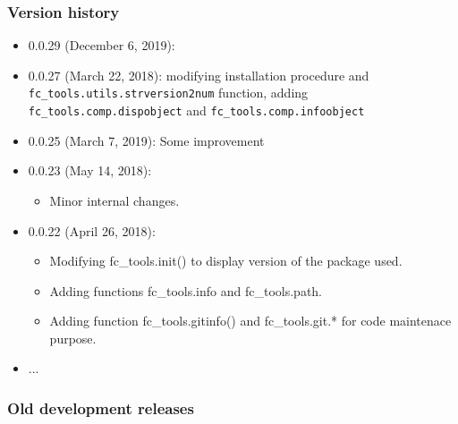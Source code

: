  
\subsubsection{Version history}

\begin{itemize}
\item 0.0.29 (December 6, 2019):
\item 0.0.27 (March 22, 2018): modifying installation procedure and \verb+fc_tools.utils.strversion2num+ function, adding \verb+fc_tools.comp.dispobject+
and \verb+fc_tools.comp.infoobject+
\item 0.0.25 (March 7, 2019): Some improvement
\item 0.0.23 (May 14, 2018):
\begin{itemize}
\item Minor internal changes.
\end{itemize}
\item 0.0.22 (April 26, 2018): 
\begin{itemize}
\item Modifying fc_tools.init() to display version of the package used.
\item Adding functions fc_tools.info and fc_tools.path.
\item Adding function fc_tools.gitinfo() and fc_tools.git.* for code maintenace purpose.
\end{itemize}
\item ...
\end{itemize} 
 
\subsubsection{Old development releases} 

\providecommand\fcInsertVersionOld{}
\renewcommand{\fcInsertVersionOld}[2]{
#1 & #2 & 
\BuildLinkWithSizeInKo{\IHTDIR/distrib/#1/fc-tools-#1.tar.gz}
                  {\OHTDIR/#1/fc-tools-#1.tar.gz}
                  {\texttt{[image: images/icons/Octave\_pkg\_40.gif]}}
& 
\begin{tabular}{l}
\BuildLinkWithSizeInKo{\IHTDIR/distrib/#1/ofc-tools-#1.tar.gz}
                  {\OHTDIR/#1/ofc-tools-#1.tar.gz}
                  {\texttt{[image: images/icons/tar-gz\_40.gif]}}
\\ 
\BuildLinkWithSizeInKo{\IHTDIR/distrib/#1/ofc-tools-#1.zip}
                  {\OHTDIR/#1/ofc-tools-#1.zip}
                  {\texttt{[image: images/icons/zip\_new40.gif]}} 
\\ 
\BuildLinkWithSizeInKo{\IHTDIR/distrib/#1/ofc-tools-#1.7z}
                  {\OHTDIR/#1/ofc-tools-#1.7z}
                  {\texttt{[image: images/icons/7z-icon-40.gif]}}                   
\end{tabular}
&
to do!
}

